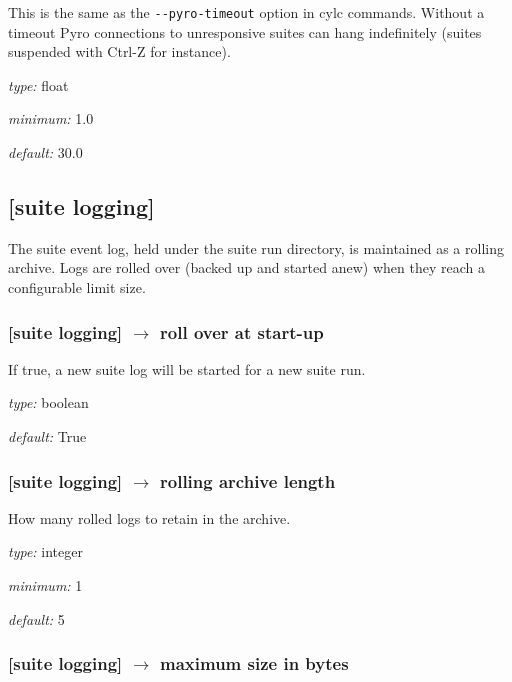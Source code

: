 This is the same as the \lstinline=--pyro-timeout= option in cylc
commands. Without a timeout Pyro connections to unresponsive
suites can hang indefinitely (suites suspended with Ctrl-Z for instance).

\begin{myitemize}
\item {\em type:} float
\item {\em minimum:} 1.0
\item {\em default:} 30.0
\end{myitemize}

\subsection{[suite logging]}

The suite event log, held under the suite run directory, is maintained
as a rolling archive. Logs are rolled over (backed up and started anew)
when they reach a configurable limit size.

\subsubsection[roll over at start-up]{[suite logging] $\rightarrow$ roll over at start-up}

If true, a new suite log will be started for a new suite run.

\begin{myitemize}
\item {\em type:} boolean
\item {\em default:} True
\end{myitemize}

\subsubsection[rolling archive length]{[suite logging] $\rightarrow$ rolling archive length}

How many rolled logs to retain in the archive.

\begin{myitemize}
\item {\em type:} integer
\item {\em minimum:} 1
\item {\em default:} 5
\end{myitemize}

\subsubsection[maximum size in bytes]{[suite logging] $\rightarrow$ maximum size in bytes}

